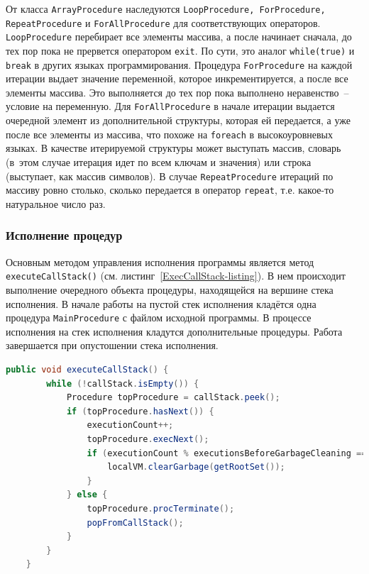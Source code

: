 \documentclass[14pt]{extarticle}
\begin{document}
От класса \texttt{ArrayProcedure} наследуются \texttt{LoopProcedure, ForProcedure, RepeatProcedure} и \texttt{ForAllProcedure} для соответствующих операторов. \texttt{LoopProcedure} перебирает все элементы массива, а после начинает сначала, до тех пор пока не прервется оператором \texttt{exit}. По сути, это аналог \texttt{while(true)} и \texttt{break} в других языках программирования. Процедура \texttt{ForProcedure} на каждой итерации выдает значение переменной, которое инкрементируется, а после все элементы массива. Это выполняется до тех пор пока выполнено неравенство~-- условие на переменную. Для \texttt{ForAllProcedure} в начале  итерации выдается очередной элемент из дополнительной структуры, которая ей передается, а уже после все элементы из массива, что похоже на \texttt{foreach} в высокоуровневых языках. В качестве итерируемой структуры может выступать массив, словарь (в~этом случае итерация идет по всем ключам и значения) или строка (выступает, как массив символов). В случае \texttt{RepeatProcedure} итераций по массиву ровно столько, сколько передается в оператор \texttt{repeat}, т.е. какое-то натуральное число раз.

\subsubsection*{Исполнение процедур}
Основным методом управления исполнения программы является метод \texttt{executeCallStack()} (см. листинг~\ref{ExecCallStack-listing}). В нем происходит выполнение очередного объекта процедуры, находящейся на вершине стека исполнения.  В начале работы на пустой стек исполнения кладётся одна процедура \texttt{MainProcedure} с файлом исходной программы. В процессе исполнения на стек исполнения кладутся дополнительные процедуры. Работа завершается при опустошении стека исполнения.

\begin{lstlisting}[label=ExecCallStack-listing,caption=Механизм исполнения, frame = none, language = Java]
    public void executeCallStack() {
        while (!callStack.isEmpty()) {
            Procedure topProcedure = callStack.peek();
            if (topProcedure.hasNext()) {
                executionCount++;
                topProcedure.execNext();
                if (executionCount % executionsBeforeGarbageCleaning == 0) {
                    localVM.clearGarbage(getRootSet());
                }
            } else {
                topProcedure.procTerminate();
                popFromCallStack();
            }
        }
    }
\end{lstlisting}
\end{document}
